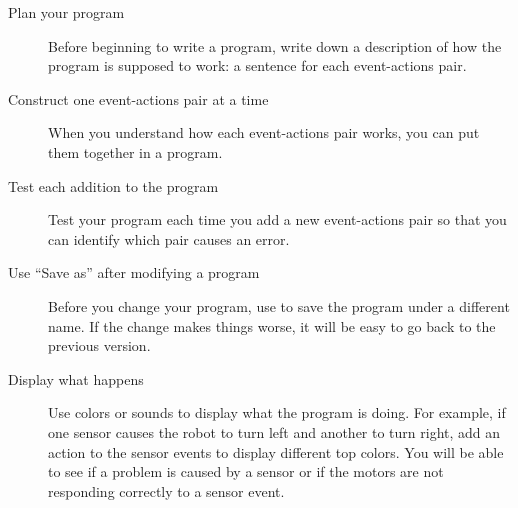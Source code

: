 \begin{description}

\item[Plan your program] Before beginning to write a program, write down
a description of how the program is supposed to work: a sentence for
each event-actions pair.

\item[Construct one event-actions pair at a time] When you understand
how each event-actions pair works, you can put them together in a
program.

\item[Test each addition to the program] Test your program each time you
add a new event-actions pair so that you can identify which pair causes
an error.

\item[Use ``Save as'' after modifying a program] Before you change your
program, use  to save the program under a different name.
If the change makes things worse, it will be easy to go back to the
previous version.

\item[Display what happens] Use colors or sounds to display what the
program is doing. For example, if one sensor causes the robot to turn
left and another to turn right, add an action to the sensor events to
display different top colors. You will be able to see if a problem is
caused by a sensor or if the motors are not responding correctly to a
sensor event.

\end{description}



